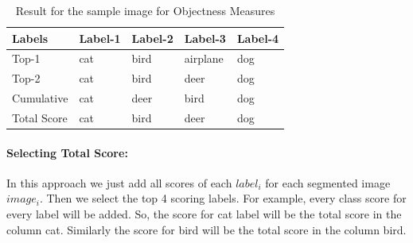 

\begin{table}
\centering
\caption{Result for the sample image for Objectness Measures}
\label{resobj}
\begin{tabularx}{\linewidth}{|*{5}{X|}}
\hline
Labels      & Label-1 & Label-2 & Label-3 & Label-4 \\ \hline
Top-1       & cat     & bird   & airplane & dog           \\ \hline
Top-2       & cat     & bird   & deer     & dog           \\ \hline
Cumulative  & cat     & deer   & bird     & dog            \\ \hline
Total Score & cat     & bird   & deer     & dog           \\ \hline
\end{tabularx}
\end{table}
\paragraph{Selecting Total Score:}
In this approach we just add all scores of each $label_{i}$ for each segmented image $image_{i}$. Then we select the top 4 scoring labels. For example, every class score for every label will be added. So, the score for cat label will be the total score in the column cat. Similarly the score for bird will be the total score in the column bird.



